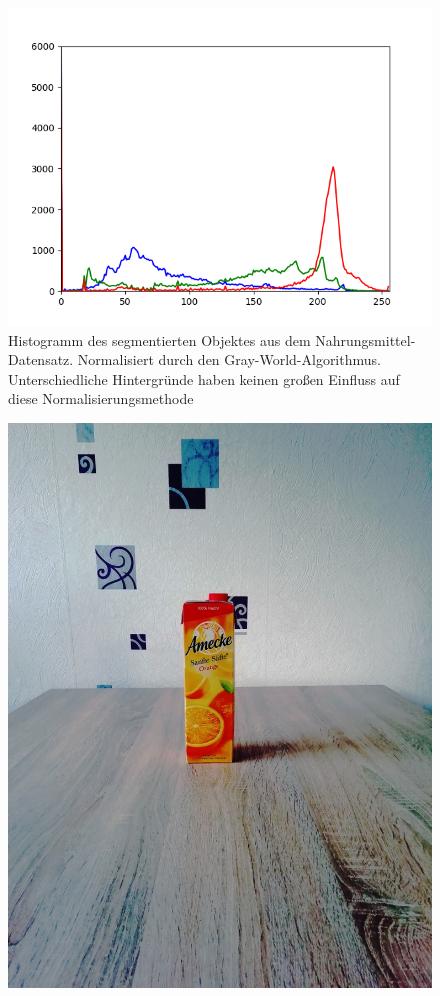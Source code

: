 \begin{appendices}
\begin{figure}[htb]
\begin{minipage}[c]{0.08\textwidth}
\end{minipage}
\hfill
\begin{minipage}[c]{0.3\textwidth}
\includegraphics[width=\textwidth]{Sources/Bild3_GW_histo.png}
\end{minipage}
\caption{Histogramm des segmentierten Objektes aus dem Nahrungsmittel-Datensatz. Normalisiert durch den Gray-World-Algorithmus. Unterschiedliche Hintergründe haben keinen großen Einfluss auf diese Normalisierungsmethode}
\label{img:evalGW}
\end{figure}
\newpage
\begin{figure}[htb]
\begin{minipage}[c]{0.2\textwidth}
\includegraphics[width=\textwidth]{Sources/Bild1_HS.jpg}

\end{minipage}
\end{figure}
\end{appendices}
